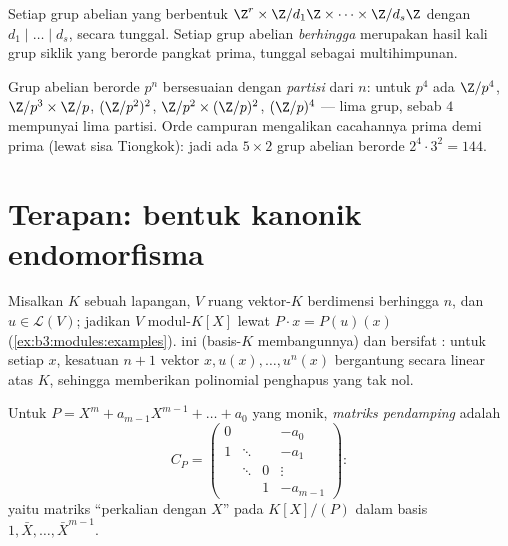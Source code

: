 \begin{corollary}
\label{cor:b3:modules:abelian}
Setiap grup abelian yang  berbentuk $\Z^r \times
\Z/d_1\Z\times\dots\times\Z/d_s\Z$ dengan $d_1 \mid \dots \mid
d_s$, secara tunggal. Setiap grup abelian \emph{berhingga} merupakan hasil kali
grup siklik yang berorde pangkat prima, tunggal sebagai
multihimpunan.
\end{corollary}

\begin{example}\label{ex:b3:modules:abelian}
Grup abelian berorde $p^n$ bersesuaian dengan \emph{partisi}
dari $n$: untuk $p^4$ ada $\Z/p^4$, $\Z/p^3\times\Z/p$,
$(\Z/p^2)^2$, $\Z/p^2 \times (\Z/p)^2$, $(\Z/p)^4$ --- lima
grup, sebab $4$ mempunyai lima partisi. Orde campuran mengalikan
cacahannya prima demi prima (lewat sisa Tiongkok): jadi ada $5 \times 2$ grup abelian
berorde $2^4 \cdot 3^2 = 144$.
\end{example}

\section{Terapan: bentuk kanonik endomorfisma}

Misalkan $K$ sebuah lapangan, $V$ ruang vektor-$K$ berdimensi berhingga
$n$, dan $u \in \mathcal L(V)$; jadikan $V$ modul-$K[X]$ lewat $P
\cdot x = P(u)(x)$ (\cref{ex:b3:modules:examples}).  ini
 (basis-$K$ membangunnya) dan bersifat : untuk
setiap $x$, kesatuan $n+1$ vektor $x, u(x), \dots, u^n(x)$ bergantung
secara linear atas $K$, sehingga memberikan polinomial penghapus yang tak nol.

\begin{definition}\label{def:b3:modules:companion}
Untuk $P = X^m + a_{m-1}X^{m-1} + \dots + a_0$ yang monik,
\emph{matriks pendamping} adalah
\[
C_P = \begin{pmatrix}
0 & & & -a_0\\
1 & \ddots & & -a_1\\
& \ddots & 0 & \vdots\\
& & 1 & -a_{m-1}
\end{pmatrix} :
\]
yaitu matriks ``perkalian dengan $X$'' pada $K[X]/(P)$ dalam
basis $1, \bar X, \dots, \bar X^{m-1}$.
\end{definition}

